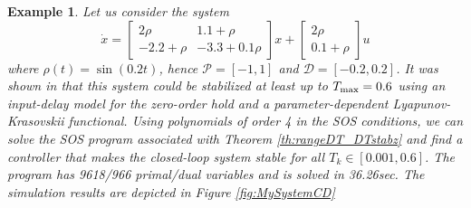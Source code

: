 \documentclass[12pt]{article}
\def\citep{\cite}
\def\Tmax{T_{\textnormal{max}}}
\providecommand{\bblue}[1]{\color{black}{#1}\color{black}\hspace{0pt}}
\newtheorem{example}[theorem]{Example}
\begin{document}
\begin{example}
  Let us consider the system \citep{Ramezanifar:12}
  \begin{equation}\label{eq:Ramezanifar}
    \dot{x}=\begin{bmatrix}
      2\rho & 1.1+\rho\\
      -2.2+\rho &-3.3+0.1\rho
    \end{bmatrix}x+\begin{bmatrix}
      2\rho\\
      0.1+\rho
    \end{bmatrix}u
  \end{equation}
  where $\rho(t)=\sin(0.2t)$, hence $\mathcal{P}=[-1,1]$ and $\mathcal{D}=[-0.2,0.2]$. It was shown in \citep{Ramezanifar:12} that this system could be stabilized at least up to $\Tmax =0.6$ using an input-delay model for the zero-order hold and a parameter-dependent Lyapunov-Krasovskii functional.
 Using polynomials of order 4 in the SOS conditions, we can solve the SOS program associated with Theorem \ref{th:rangeDT_DTstabz} and find a controller that makes the closed-loop system stable for all $T_k\in[0.001,0.6]$. The program has 9618/966 primal/dual variables and is solved in 36.26sec. The simulation results are depicted in Figure \ref{fig:MySystemCD} \bblue{where the dwell-time values were randomly selected in the interval $[0.001,0.6]$. The initial conditions are chosen to be $x_0=(-1,1)$, $u_0=0$.}
\end{example}
\end{document}
